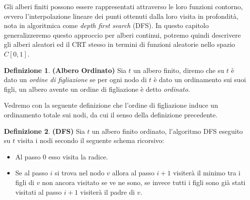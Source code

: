 \documentclass[11pt, twoside]{report}
\theoremstyle{definition}
\newtheorem{definizione}{Definizione}[chapter]
\theoremstyle{plain}
\theoremstyle{remark}
\numberwithin{equation}{chapter}
\begin{document}
Gli alberi finiti possono essere rappresentati attraverso le loro funzioni contorno, ovvero l'interpolazione lineare dei punti ottenuti dalla loro visita in profondità, nota in algoritmica come \textit{depth first search} (DFS). In questo capitolo generalizzeremo questo approccio per alberi continui, potremo quindi descrivere gli alberi aleatori ed il CRT stesso in termini di funzioni aleatorie nello spazio $C[0,1]$.

\begin{definizione}{\textbf{(Albero Ordinato)}}
Sia $t$ un albero finito, diremo che su $t$ è dato un \textit{ordine di figliazione} se per ogni nodo di $t$ è dato un ordinamento sui suoi figli, un albero avente un ordine di figliazione è detto \textit{ordinato}.
\end{definizione}

Vedremo con la seguente definizione che l'ordine di figliazione induce un ordinamento totale sui nodi, da cui il senso della definizione precedente.

\begin{definizione}{\textbf{(DFS)}}
Sia $t$ un albero finito ordinato, l'algoritmo DFS eseguito su $t$ visita i nodi secondo il seguente schema ricorsivo:
\begin{itemize}
\item Al passo $0$ esso visita la radice.

\item Se al passo $i$ si trova nel nodo $v$ allora al passo $i+1$ visiterà il minimo tra i figli di $v$ non ancora visitato se ve ne sono, se invece tutti i figli sono già stati visitati al passo $i+1$ visiterà il padre di $v$.
\end{itemize}
\end{definizione}
\end{document}
